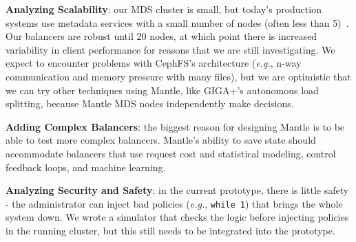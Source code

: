 \textbf{Analyzing Scalability}: our MDS cluster is small, but today's production systems use metadata services with a small number of nodes (often less than 5)~\cite{website:ceph-cephfs-product-release}. Our balancers are robust until 20 nodes, at which point there is increased variability in client performance for reasons that we are still investigating. We expect to encounter problems with CephFS's architecture ({\it e.g.}, n-way communication and memory pressure with many files), but we are optimistic that we can try other techniques using Mantle, like GIGA+'s autonomous load splitting, because Mantle MDS nodes independently make decisions. 


\textbf{Adding Complex Balancers}: the biggest reason for designing Mantle is to be able to test more complex balancers. Mantle's ability to save state should accommodate balancers that use request cost and statistical modeling, control feedback loops, and machine learning.

\textbf{Analyzing Security and Safety}: in the current prototype, there is little safety - the administrator can inject bad policies ({\it e.g.}, \texttt{while 1}) that brings the whole system down. We wrote a simulator that checks the logic before injecting policies in the running cluster, but this still needs to be integrated into the prototype.


